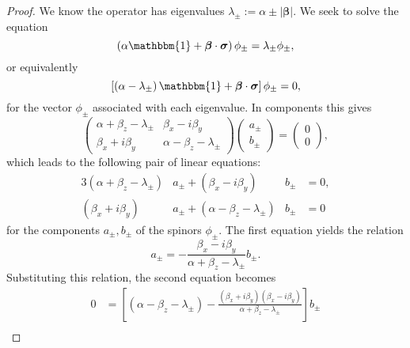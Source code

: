 \documentclass[12pt]{article}
\begin{document}
\begin{proof}
  We know the operator has eigenvalues $\lambda_{\pm} := \alpha \pm
|\bm{\beta}|$. We seek to solve the equation
  \begin{displaymath}
    \left( \alpha \mathbbm{1} + \bm{\beta} \cdot
  \bm{\sigma} \right) \phi_{\pm} = \lambda_{\pm} \phi_{\pm},
  \end{displaymath}
  or equivalently
  \begin{displaymath}
    \left[ \left( \alpha - \lambda_{\pm} \right) \mathbbm{1} + \bm{\beta} \cdot
  \bm{\sigma} \right] \phi_{\pm} = 0,
  \end{displaymath}
  for the vector $\phi_{\pm}$ associated with each eigenvalue. In components this gives
  \begin{displaymath}
    \begin{pmatrix}
      \alpha + \beta_z - \lambda_{\pm} & \beta_x - i \beta_y \\
      \beta_x + i \beta_y & \alpha - \beta_z - \lambda_{\pm}
    \end{pmatrix}
    \begin{pmatrix}
      a_{\pm} \\
      b_{\pm}
    \end{pmatrix}
    =
    \begin{pmatrix}
      0 \\
      0
    \end{pmatrix},
  \end{displaymath}
  which leads to the following pair of linear equations:
  \begin{alignat*}{3}
    (\alpha + \beta_z - \lambda_{\pm})&a_{\pm} + (\beta_x - i \beta_y)&b_{\pm} &= 0, \\
    (\beta_x + i \beta_y)&a_{\pm} + (\alpha - \beta_z - \lambda_{\pm})&b_{\pm} &= 0
  \end{alignat*}
  for the components $a_{\pm}, b_{\pm}$ of the spinors $\phi_{\pm}$. The first equation yields the relation
  \begin{displaymath}
    a_{\pm} = - \frac{\beta_x - i \beta_y}{\alpha + \beta_z - \lambda_{\pm}} b_{\pm}.
  \end{displaymath}
  Substituting this relation, the second equation becomes
  \begin{displaymath}
    \begin{split}
      0
      &= \left[ (\alpha - \beta_z - \lambda_{\pm}) - \frac{(\beta_x + i \beta_y)(\beta_x - i \beta_y)}{\alpha + \beta_z - \lambda_{\pm}} \right] b_{\pm} \\

\end{split}
\end{displaymath}
\end{proof}
\end{document}
